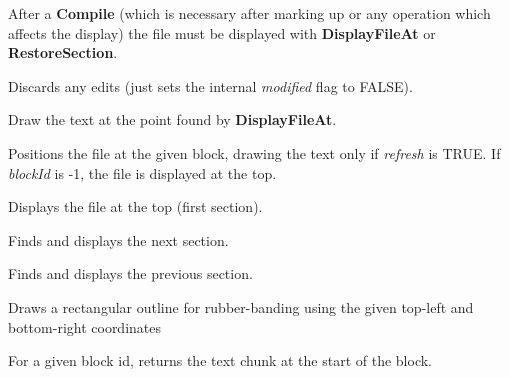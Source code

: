 After a {\bf Compile} (which is necessary after marking up or any
operation which affects the display) the file must be displayed with
{\bf DisplayFileAt} or {\bf RestoreSection}.



Discards any edits (just sets the internal {\it modified} flag to FALSE).



Draw the text at the point found by {\bf DisplayFileAt}.



Positions the file at the given block, drawing the text only if {\it refresh} is TRUE.
If {\it blockId} is -1, the file is displayed at the top.



Displays the file at the top (first section).



Finds and displays the next section.



Finds and displays the previous section.



Draws a rectangular outline for rubber-banding using the given
top-left and bottom-right coordinates



For a given block id, returns the text chunk at the start of the
block.

